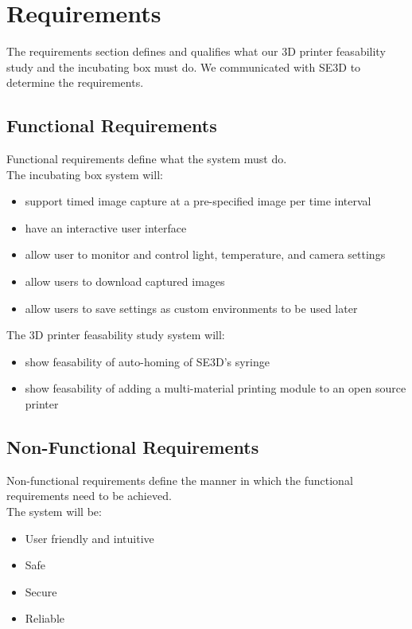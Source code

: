 \chapter{Requirements}

The requirements section defines and qualifies what our 3D printer feasability study and the incubating box must do. We communicated with SE3D to determine the requirements.

\section{Functional Requirements}

Functional requirements define what the system must do. \\
The incubating box system will:
\begin{itemize}
	\item support timed image capture at a pre-specified image per time interval
	\item have an interactive user interface
	\item allow user to monitor and control light, temperature, and camera settings
	\item allow users to download captured images
	\item allow users to save settings as custom environments to be used later
\end{itemize}



The 3D printer feasability study system will:
\begin{itemize}
	\item show feasability of auto-homing of SE3D's syringe 
	\item show feasability of adding a multi-material printing module to an open source printer
\end{itemize}



\section{Non-Functional Requirements}
Non-functional requirements define the manner in which the functional requirements need to be achieved. \\
The system will be:
\begin{itemize}
	\item User friendly and intuitive
	\item Safe
	\item Secure
	\item Reliable
\end{itemize} 

